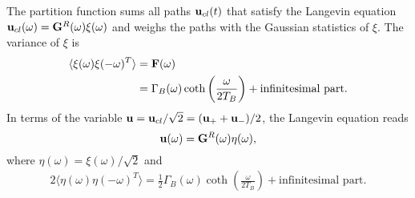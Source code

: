 The partition function sums all paths $\mathbf{u}_{cl}(t)$ that satisfy the Langevin equation $\mathbf{u}_{cl}(\omega)=\mathbf{G}^R(\omega)\xi(\omega)$ and weighs the paths with the Gaussian statistics of $\xi$. The variance of $\xi$ is 
\begin{alignat}{2}
 \langle \xi(\omega) \xi(-\omega)^T \rangle &= \mathbf{F}(\omega) \\
  &= \Gamma_B(\omega) \coth\left(\frac{\omega}{2T_B}\right) + \textrm{infinitesimal part}.
\end{alignat}
In terms of the variable $\mathbf{u}=\mathbf{u}_{cl}/\sqrt{2}=(\mathbf{u}_++\mathbf{u}_-)/2$, the Langevin equation reads
\begin{equation}
 \mathbf{u}(\omega) = \mathbf{G}^R(\omega) \eta(\omega),
\end{equation}
where $\eta(\omega)=\xi(\omega)/\sqrt{2}$ and
\begin{alignat}{2}
 \langle \eta(\omega) \eta(-\omega)^T \rangle = \frac{1}{2} \Gamma_B(\omega) \coth\left(\frac{\omega}{2T_B}\right) + \textrm{infinitesimal part}.
\end{alignat}


